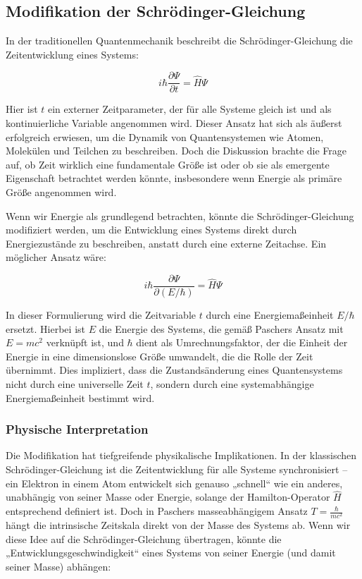 \documentclass{article}
\begin{document}
	\subsection{Modifikation der Schrödinger-Gleichung}
	
	In der traditionellen Quantenmechanik beschreibt die Schrödinger-Gleichung die Zeitentwicklung eines Systems:
	
	\[
	i\hbar \frac{\partial \Psi}{\partial t} = \hat{H} \Psi
	\]
	
	Hier ist \( t \) ein externer Zeitparameter, der für alle Systeme gleich ist und als kontinuierliche Variable angenommen wird. Dieser Ansatz hat sich als äußerst erfolgreich erwiesen, um die Dynamik von Quantensystemen wie Atomen, Molekülen und Teilchen zu beschreiben. Doch die Diskussion brachte die Frage auf, ob Zeit wirklich eine fundamentale Größe ist oder ob sie als emergente Eigenschaft betrachtet werden könnte, insbesondere wenn Energie als primäre Größe angenommen wird.
	
	Wenn wir Energie als grundlegend betrachten, könnte die Schrödinger-Gleichung modifiziert werden, um die Entwicklung eines Systems direkt durch Energiezustände zu beschreiben, anstatt durch eine externe Zeitachse. Ein möglicher Ansatz wäre:
	
	\[
	i\hbar \frac{\partial \Psi}{\partial (E/\hbar)} = \hat{H} \Psi
	\]
	
	In dieser Formulierung wird die Zeitvariable \( t \) durch eine Energiemaßeinheit \( E/\hbar \) ersetzt. Hierbei ist \( E \) die Energie des Systems, die gemäß Paschers Ansatz mit \( E = mc^2 \) verknüpft ist, und \( \hbar \) dient als Umrechnungsfaktor, der die Einheit der Energie in eine dimensionslose Größe umwandelt, die die Rolle der Zeit übernimmt. Dies impliziert, dass die Zustandsänderung eines Quantensystems nicht durch eine universelle Zeit \( t \), sondern durch eine systemabhängige Energiemaßeinheit bestimmt wird.
	
	\subsubsection{Physische Interpretation}
	
	Die Modifikation hat tiefgreifende physikalische Implikationen. In der klassischen Schrödinger-Gleichung ist die Zeitentwicklung für alle Systeme synchronisiert – ein Elektron in einem Atom entwickelt sich genauso „schnell“ wie ein anderes, unabhängig von seiner Masse oder Energie, solange der Hamilton-Operator \( \hat{H} \) entsprechend definiert ist. Doch in Paschers masseabhängigem Ansatz \( T = \frac{\hbar}{mc^2} \) hängt die intrinsische Zeitskala direkt von der Masse des Systems ab. Wenn wir diese Idee auf die Schrödinger-Gleichung übertragen, könnte die „Entwicklungsgeschwindigkeit“ eines Systems von seiner Energie (und damit seiner Masse) abhängen:
	
\end{document}
